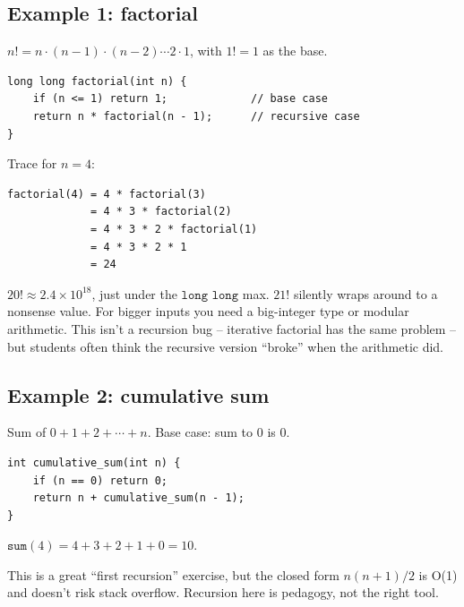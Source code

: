 \documentclass[11pt]{article}
\begin{document}
\subsection{Example 1: factorial}

$n! = n \cdot (n-1) \cdot (n-2) \cdots 2 \cdot 1$, with $1! = 1$ as the
base.

\begin{examplebox}[Factorial in C++]
\begin{verbatim}
long long factorial(int n) {
    if (n <= 1) return 1;             // base case
    return n * factorial(n - 1);      // recursive case
}
\end{verbatim}
Trace for $n = 4$:
\begin{verbatim}
factorial(4) = 4 * factorial(3)
             = 4 * 3 * factorial(2)
             = 4 * 3 * 2 * factorial(1)
             = 4 * 3 * 2 * 1
             = 24
\end{verbatim}
\end{examplebox}

\begin{warnbox}[\texttt{n!} overflows 64-bit \texttt{long long} at $n = 21$]
$20! \approx 2.4 \times 10^{18}$, just under the $\texttt{long long}$
max. $21!$ silently wraps around to a nonsense value. For bigger
inputs you need a big-integer type or modular arithmetic. This isn't
a recursion bug -- iterative factorial has the same problem -- but
students often think the recursive version ``broke'' when the
arithmetic did.
\end{warnbox}

\subsection{Example 2: cumulative sum}

Sum of $0 + 1 + 2 + \cdots + n$. Base case: sum to $0$ is $0$.

\begin{examplebox}
\begin{verbatim}
int cumulative_sum(int n) {
    if (n == 0) return 0;
    return n + cumulative_sum(n - 1);
}
\end{verbatim}
$\texttt{sum}(4) = 4 + 3 + 2 + 1 + 0 = 10$.

This is a great ``first recursion'' exercise, but the closed form
$n(n+1)/2$ is O(1) and doesn't risk stack overflow. Recursion here is
pedagogy, not the right tool.
\end{examplebox}
\end{document}
